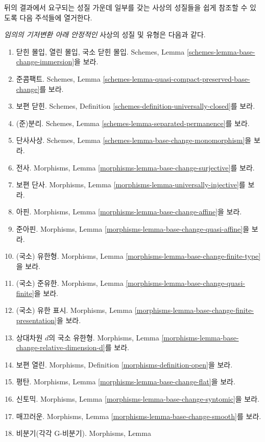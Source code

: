 \noindent
뒤의 결과에서 요구되는 성질 가운데 일부를 갖는 사상의 성질들을 쉽게
참조할 수 있도록 다음 주석들에 열거한다.

\begin{remark}
\label{remark-list-properties-stable-base-change}
{\it 임의의 기저변환 아래 안정적인} 사상의 성질 및 유형은 다음과 같다.
\begin{enumerate}
\item 닫힌 몰입, 열린 몰입, 국소 닫힌 몰입. Schemes, Lemma
\ref{schemes-lemma-base-change-immersion}을 보라.
\item 준콤팩트. Schemes, Lemma
\ref{schemes-lemma-quasi-compact-preserved-base-change}를 보라.
\item 보편 닫힌. Schemes, Definition
\ref{schemes-definition-universally-closed}를 보라.
\item (준)분리. Schemes, Lemma
\ref{schemes-lemma-separated-permanence}를 보라.
\item 단사사상. Schemes, Lemma
\ref{schemes-lemma-base-change-monomorphism}을 보라.
\item 전사. Morphisms, Lemma
\ref{morphisms-lemma-base-change-surjective}를 보라.
\item 보편 단사. Morphisms, Lemma
\ref{morphisms-lemma-universally-injective}를 보라.
\item 아핀. Morphisms, Lemma
\ref{morphisms-lemma-base-change-affine}을 보라.
\item 준아핀. Morphisms, Lemma
\ref{morphisms-lemma-base-change-quasi-affine}을 보라.
\item (국소) 유한형. Morphisms, Lemma
\ref{morphisms-lemma-base-change-finite-type}을 보라.
\item (국소) 준유한. Morphisms, Lemma
\ref{morphisms-lemma-base-change-quasi-finite}을 보라.
\item (국소) 유한 표시. Morphisms, Lemma
\ref{morphisms-lemma-base-change-finite-presentation}을 보라.
\item 상대차원 $d$의 국소 유한형. Morphisms, Lemma
\ref{morphisms-lemma-base-change-relative-dimension-d}를 보라.
\item 보편 열린. Morphisms, Definition
\ref{morphisms-definition-open}을 보라.
\item 평탄. Morphisms, Lemma
\ref{morphisms-lemma-base-change-flat}을 보라.
\item 신토믹. Morphisms, Lemma
\ref{morphisms-lemma-base-change-syntomic}을 보라.
\item 매끄러운. Morphisms, Lemma
\ref{morphisms-lemma-base-change-smooth}를 보라.
\item 비분기(각각 G-비분기). Morphisms, Lemma

\end{enumerate}
\end{remark}
